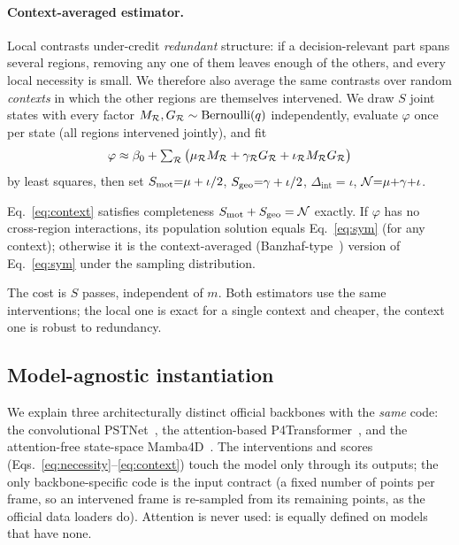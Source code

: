 \paragraph{Context-averaged estimator.} Local contrasts under-credit \emph{redundant} structure: if a decision-relevant part spans several regions, removing any one of them leaves enough of the others, and every local necessity is small. We therefore also average the same contrasts over random \emph{contexts} in which the other regions are themselves intervened. We draw $S$ joint states with every factor $M_{\mathcal{R}},G_{\mathcal{R}}\sim\mathrm{Bernoulli}(q)$ independently, evaluate $\varphi$ once per state (all regions intervened jointly), and fit
\begin{equation}
\varphi\approx\beta_0+\textstyle\sum_{\mathcal{R}}\big(\mu_{\mathcal{R}}M_{\mathcal{R}}+\gamma_{\mathcal{R}}G_{\mathcal{R}}+\iota_{\mathcal{R}}M_{\mathcal{R}}G_{\mathcal{R}}\big)
\label{eq:context}
\end{equation}
by least squares, then set $S_{\mathrm{mot}}{=}\mu+\iota/2$, $S_{\mathrm{geo}}{=}\gamma+\iota/2$, $\Delta_{\mathrm{int}}{=}\iota$, $\mathcal{N}{=}\mu{+}\gamma{+}\iota$.
\begin{proposition}
\label{prop:context}
Eq.~\eqref{eq:context} satisfies completeness $S_{\mathrm{mot}}+S_{\mathrm{geo}}=\mathcal{N}$ exactly. If $\varphi$ has no cross-region interactions, its population solution equals Eq.~\eqref{eq:sym} (for any context); otherwise it is the context-averaged (Banzhaf-type~\cite{banzhaf1965}) version of Eq.~\eqref{eq:sym} under the sampling distribution.
\end{proposition}
The cost is $S$ passes, independent of $m$. Both estimators use the same interventions; the local one is exact for a single context and cheaper, the context one is robust to redundancy.


\subsection{Model-agnostic instantiation}
\label{sec:method-inst}
We explain three architecturally distinct official backbones with the \emph{same} code: the convolutional PSTNet~\cite{fan2021pstnet}, the attention-based P4Transformer~\cite{fan2021p4transformer}, and the attention-free state-space Mamba4D~\cite{liu2025mamba4d}. The interventions and scores (Eqs.~\eqref{eq:necessity}--\eqref{eq:context}) touch the model only through its outputs; the only backbone-specific code is the input contract (a fixed number of points per frame, so an intervened frame is re-sampled from its remaining points, as the official data loaders do). Attention is never used: \method is equally defined on models that have none.
